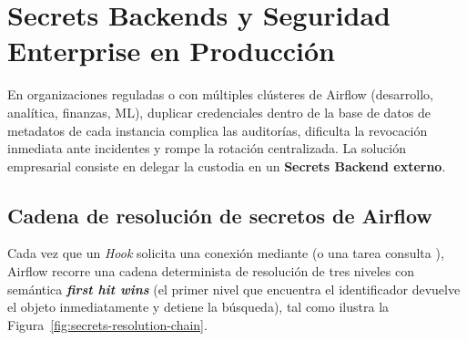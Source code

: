 \section{Secrets Backends y Seguridad Enterprise en Producción}\label{sec:secrets-backends}

En organizaciones reguladas o con múltiples clústeres de Airflow (desarrollo, analítica, finanzas, ML), duplicar credenciales dentro de la base de datos de metadatos de cada instancia complica las auditorías, dificulta la revocación inmediata ante incidentes y rompe la rotación centralizada. La solución empresarial consiste en delegar la custodia en un \textbf{Secrets Backend externo}.

\subsection{Cadena de resolución de secretos de Airflow}

Cada vez que un \textit{Hook} solicita una conexión mediante  (o una tarea consulta ), Airflow recorre una cadena determinista de resolución de tres niveles con semántica \textbf{\textit{first hit wins}} (el primer nivel que encuentra el identificador devuelve el objeto inmediatamente y detiene la búsqueda), tal como ilustra la Figura~\ref{fig:secrets-resolution-chain}.

